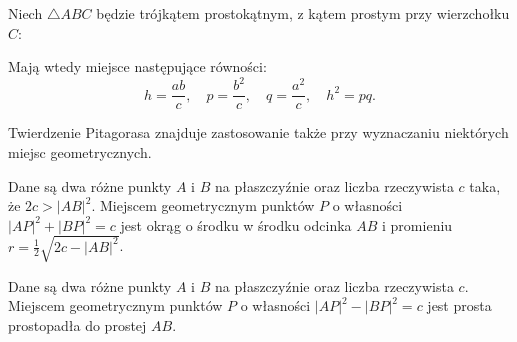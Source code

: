 \begin{proposition}
    Niech $\triangle ABC$ będzie trójkątem prostokątnym, z kątem prostym przy wierzchołku $C$:
        \begin{center}
\begin{comment}
    \begin{tikzpicture}[scale=.4]
        \tkzDefPoint(200:5){A}
        \tkzDefPoint(20:5){B}
        \tkzDefPoint(90:5){C}
        \tkzDefPointsBy[projection=onto A--B](C){D}
        \tkzLabelPoint[below left](200:5){A}
        \tkzLabelPoint[below right](22:5.3){B}
        \tkzLabelPoint[above](90:5.2){C}
        
        \tkzMarkRightAngle[size=0.8](A,C,B)
        \tkzDrawPolygons[line width=0.2mm](A,B,C)
        \tkzDrawSegment[dim={$\,\,p\,\,$,-8pt,transform shape,sloped}](A,D)
        \tkzDrawSegment[dim={$\,\,q\,\,$,-8pt,transform shape,sloped}](D,B)
        \tkzDrawSegment[dim={$\,\,b\,\,$,-8pt,transform shape,sloped}](C,A)
        \tkzDrawSegment[dim={$\,\,a\,\,$,-8pt,transform shape,sloped}](B,C)
        \tkzDrawPoints[size=3,color=black,fill=black!50](A,B,C)
        \tkzDrawSegment[dim={$\,\,h\,\,$,-0pt,transform shape,sloped}](C,D)
\end{tikzpicture}
\end{comment}
    \end{center}
    Mają wtedy miejsce następujące równości:
    \begin{equation}
        h = \frac{ab}{c}, \quad
        p = \frac{b^2}{c}, \quad
        q = \frac{a^2}{c}, \quad
        h^2 = pq.
    \end{equation}
\end{proposition}

Twierdzenie Pitagorasa znajduje zastosowanie także przy wyznaczaniu niektórych miejsc geometrycznych.

\begin{proposition}
    Dane są dwa różne punkty $A$ i $B$ na płaszczyźnie oraz liczba rzeczywista $c$ taka, że $2c > |AB|^2$.
    Miejscem geometrycznym punktów $P$ o własności $|AP|^2 + |BP|^2 = c$ jest okrąg o środku w środku odcinka $AB$ i promieniu $r = \frac 1 2 \sqrt{2c - |AB|^2}$.
\end{proposition}

\begin{proposition}
    Dane są dwa różne punkty $A$ i $B$ na płaszczyźnie oraz liczba rzeczywista $c$.
    Miejscem geometrycznym punktów $P$ o własności $|AP|^2 - |BP|^2 = c$ jest prosta prostopadła do prostej $AB$.
\end{proposition}

